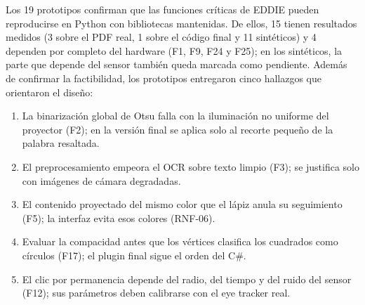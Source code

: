 Los 19 prototipos confirman que las funciones críticas de EDDIE pueden reproducirse en Python con bibliotecas mantenidas. De ellos, 15 tienen resultados medidos (3 sobre el PDF real, 1 sobre el código final y 11 sintéticos) y 4 dependen por completo del hardware (F1, F9, F24 y F25); en los sintéticos, la parte que depende del sensor también queda marcada como pendiente. Además de confirmar la factibilidad, los prototipos entregaron cinco hallazgos que orientaron el diseño:
\begin{enumerate}
  \item La binarización global de Otsu falla con la iluminación no uniforme del proyector (F2); en la versión final se aplica solo al recorte pequeño de la palabra resaltada.
  \item El preprocesamiento empeora el OCR sobre texto limpio (F3); se justifica solo con imágenes de cámara degradadas.
  \item El contenido proyectado del mismo color que el lápiz anula su seguimiento (F5); la interfaz evita esos colores (RNF-06).
  \item Evaluar la compacidad antes que los vértices clasifica los cuadrados como círculos (F17); el plugin final sigue el orden del C\#.
  \item El clic por permanencia depende del radio, del tiempo y del ruido del sensor (F12); sus parámetros deben calibrarse con el eye tracker real.
\end{enumerate}
